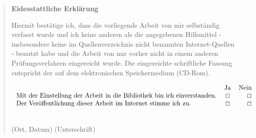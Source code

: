 
\pagestyle{empty}
\begin{quote}
	\textbf{\Large\sffamily Eidesstattliche Erkl\"arung}

	Hiermit best\"atige ich, dass die vorliegende Arbeit von mir selbst\"andig verfasst wurde und ich keine anderen als die angegebenen Hilfsmittel - insbesondere keine im Quellenverzeichnis nicht benannten Internet-Quellen - benutzt habe und die Arbeit von mir vorher nicht in einem anderen Pr\"ufungsverfahren eingereicht wurde. Die eingereichte schriftliche Fassung entspricht der auf dem elektronischen Speichermedium (CD-Rom).

	\vspace{2em}
	$$
	\begin{tabular}{ l c r }
		&  Ja & Nein \\
		Mit der Einstellung der Arbeit in die Bibliothek bin ich einverstanden. & \Square & \Square\\
		Der Ver\"offentlichung dieser Arbeit im Internet stimme ich zu. & \Square & \Square
	\end{tabular}
	$$

	\vspace{5em}

	\\(Ort, Datum) \hspace{3cm} (Unterschrift)
\end{quote}
